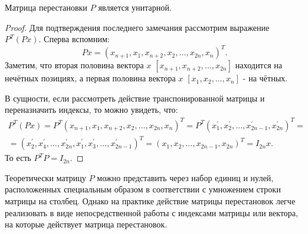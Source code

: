 \begin{claim}
    Матрица перестановки \(P\) является унитарной.
\end{claim}
\begin{proof}
    Для подтверждения последнего замечания рассмотрим выражение \(P^T(Px)\). Сперва вспомним: 
    \begin{equation}
        Px=(x_{n+1},x_1, x_{n+2},x_2,\dots,x_{2n},x_n)^T.
    \end{equation}
    Заметим, что вторая половина вектора \(x\) \([x_{n+1},x_{n+2},\dots,x_{2n}]\) находится на нечётных позициях, а первая половина вектора  \(x\) \([x_{1},x_{2},\dots,x_{n}]\) - на чётных. 

    В сущности, если рассмотреть действие транспонированной матрицы и переназначить индексы, то можно увидеть, что:
    \begin{equation*}
        \begin{split}
            P^T(Px)=P^T(x_{n+1},x_1, x_{n+2},x_2,\dots,x_{2n},x_n)^T=P^T(x_{1}^\prime,x_2^\prime,\dots,x_{2n-1}^\prime,x_{2n}^\prime)^T=\\[6pt]=(x_2^\prime,x_4^\prime,\dots,x_{2n}^\prime,x_1^\prime,x_3^\prime,\dots,x_{2n-1}^\prime)^T=(x_{1},x_2,\dots,x_{2n-1},x_{2n})^T=I_{2n}x. 
        \end{split}
    \end{equation*}
    То есть \(P^TP=I_{2n}\).
\end{proof}

\begin{note}
    Теоретически матрицу \(P\) можно представить через набор единиц и нулей, расположенных специальным образом в соответствии с умножением строки матрицы на столбец. Однако на практике действие матрицы перестановок легче реализовать в виде непосредственной работы с индексами матрицы или вектора, на которые действует матрица перестановок.   
\end{note}

